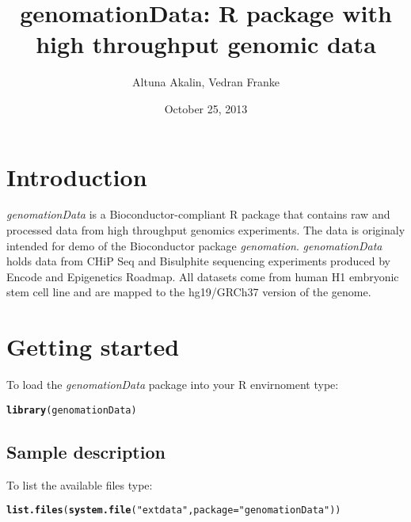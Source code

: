 \documentclass[12pt]{article}\usepackage[]{graphicx}\usepackage[]{color}
\author{Altuna Akalin, Vedran Franke}
\title{\textsf{genomationData: R package with high throughput genomic data}}
\date{October 25, 2013}
\makeatletter
\newcommand{\hlstr}[1]{\textcolor[rgb]{0.192,0.494,0.8}{#1}}%
\newcommand{\hlstd}[1]{\textcolor[rgb]{0.345,0.345,0.345}{#1}}%
\newcommand{\hlkwc}[1]{\textcolor[rgb]{0.333,0.667,0.333}{#1}}%
\newcommand{\hlkwd}[1]{\textcolor[rgb]{0.737,0.353,0.396}{\textbf{#1}}}%
\newenvironment{kframe}{%
 \def\at@end@of@kframe{}%
 \ifinner\ifhmode%
  \def\at@end@of@kframe{\end{minipage}}%
  \begin{minipage}{\columnwidth}%
 \fi\fi%
 \def\FrameCommand##1{\hskip\@totalleftmargin \hskip-\fboxsep
 \colorbox{shadecolor}{##1}\hskip-\fboxsep
     \hskip-\linewidth \hskip-\@totalleftmargin \hskip\columnwidth}%
 \MakeFramed {\advance\hsize-\width
   \@totalleftmargin\z@ \linewidth\hsize
   \@setminipage}}%
 {\par\unskip\endMakeFramed%
 \at@end@of@kframe}
\newenvironment{knitrout}{}{} %
\newcommand{\Rpackage}[1]{{\textit{#1}}}
\makeatother
\begin{document}
\maketitle

\tableofcontents

\section{Introduction}

\Rpackage{genomationData} is a Bioconductor-compliant R package that contains raw and processed data from high throughput genomics experiments. The data is originaly intended for demo of the Bioconductor package \Rpackage{genomation}.
\Rpackage{genomationData} holds data from CHiP Seq and Bisulphite sequencing experiments produced by Encode and Epigenetics Roadmap. All datasets come from human H1 embryonic stem cell line and are mapped to the hg19/GRCh37 version of the genome.


\section{Getting started}

To load the \Rpackage{genomationData} package into your R envirnoment type:
\begin{knitrout}
\color{fgcolor}\begin{kframe}
\begin{alltt}
\hlkwd{library}\hlstd{(genomationData)}
\end{alltt}
\end{kframe}
\end{knitrout}


\subsection{Sample description}
To list the available files type:
\begin{knitrout}
\color{fgcolor}\begin{kframe}
\begin{alltt}
\hlkwd{list.files}\hlstd{(}\hlkwd{system.file}\hlstd{(}\hlstr{"extdata"}\hlstd{,} \hlkwc{package} \hlstd{=} \hlstr{"genomationData"}\hlstd{))}
\end{alltt}
\end{kframe}
\end{knitrout}
\end{document}
